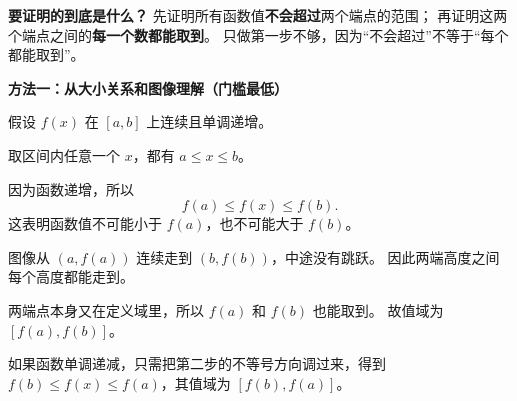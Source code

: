 \clearpage
\begin{proofbox}
    \textbf{\textcolor{CProof}{要证明的到底是什么？}}
    先证明所有函数值\textbf{不会超过}两个端点的范围；
    再证明这两个端点之间的\textbf{每一个数都能取到}。
    只做第一步不够，因为“不会超过”不等于“每个都能取到”。

    \medskip
    \textbf{\textcolor{CProof}{方法一：从大小关系和图像理解（门槛最低）}}
\begin{center}\end{center}

    假设 $f(x)$ 在 $[a,b]$ 上连续且单调递增。
    \begin{description}[style=nextline,leftmargin=2.8em,labelsep=0.5em,itemsep=0.48em]
        \item[\textbf{第一步：先排出 $x$ 的顺序。}]
            取区间内任意一个 $x$，都有 $a\le x\le b$。
        \item[\textbf{第二步：让函数值跟着排列。}]
            因为函数递增，所以
            \[
                f(a)\le f(x)\le f(b).
            \]
            这表明函数值不可能小于 $f(a)$，也不可能大于 $f(b)$。
        \item[\textbf{第三步：看有没有漏掉的高度。}]
            图像从 $(a,f(a))$ 连续走到 $(b,f(b))$，中途没有跳跃。
            因此两端高度之间每个高度都能走到。
        \item[\textbf{第四步：写出值域。}]
            两端点本身又在定义域里，所以 $f(a)$ 和 $f(b)$ 也能取到。
            故值域为 $[f(a),f(b)]$。
    \end{description}
    如果函数单调递减，只需把第二步的不等号方向调过来，得到
    $f(b)\le f(x)\le f(a)$，其值域为 $[f(b),f(a)]$。

    \medskip
    \end{proofbox}
\clearpage
